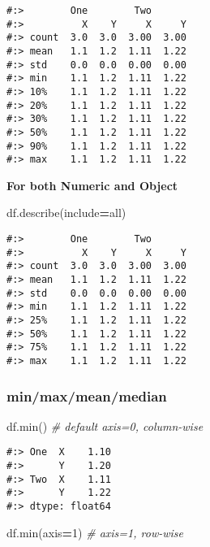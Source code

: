 \documentclass[
]{book}
\newenvironment{Shaded}{\begin{snugshade}}{\end{snugshade}}
\newcommand{\BuiltInTok}[1]{#1}
\newcommand{\CommentTok}[1]{\textcolor[rgb]{0.37,0.37,0.37}{\textit{#1}}}
\newcommand{\DecValTok}[1]{\textcolor[rgb]{0.06,0.06,0.06}{#1}}
\newcommand{\NormalTok}[1]{#1}
\newcommand{\OperatorTok}[1]{\textcolor[rgb]{0.43,0.43,0.43}{\textbf{#1}}}
\newcommand{\StringTok}[1]{\textcolor[rgb]{0.5,0.5,0.5}{#1}}
\begin{document}
\begin{verbatim}
#:>        One        Two      
#:>          X    Y     X     Y
#:> count  3.0  3.0  3.00  3.00
#:> mean   1.1  1.2  1.11  1.22
#:> std    0.0  0.0  0.00  0.00
#:> min    1.1  1.2  1.11  1.22
#:> 10%    1.1  1.2  1.11  1.22
#:> 20%    1.1  1.2  1.11  1.22
#:> 30%    1.1  1.2  1.11  1.22
#:> 50%    1.1  1.2  1.11  1.22
#:> 90%    1.1  1.2  1.11  1.22
#:> max    1.1  1.2  1.11  1.22
\end{verbatim}

\textbf{For both Numeric and Object}

\begin{Shaded}
\begin{Highlighting}[]
\NormalTok{df.describe(include}\OperatorTok{=}\StringTok{\textquotesingle{}all\textquotesingle{}}\NormalTok{)}
\end{Highlighting}
\end{Shaded}

\begin{verbatim}
#:>        One        Two      
#:>          X    Y     X     Y
#:> count  3.0  3.0  3.00  3.00
#:> mean   1.1  1.2  1.11  1.22
#:> std    0.0  0.0  0.00  0.00
#:> min    1.1  1.2  1.11  1.22
#:> 25%    1.1  1.2  1.11  1.22
#:> 50%    1.1  1.2  1.11  1.22
#:> 75%    1.1  1.2  1.11  1.22
#:> max    1.1  1.2  1.11  1.22
\end{verbatim}

\hypertarget{minmaxmeanmedian}{%
\subsubsection{min/max/mean/median}\label{minmaxmeanmedian}}

\begin{Shaded}
\begin{Highlighting}[]
\NormalTok{df.}\BuiltInTok{min}\NormalTok{()  }\CommentTok{\# default axis=0, column{-}wise}
\end{Highlighting}
\end{Shaded}

\begin{verbatim}
#:> One  X    1.10
#:>      Y    1.20
#:> Two  X    1.11
#:>      Y    1.22
#:> dtype: float64
\end{verbatim}

\begin{Shaded}
\begin{Highlighting}[]
\NormalTok{df.}\BuiltInTok{min}\NormalTok{(axis}\OperatorTok{=}\DecValTok{1}\NormalTok{) }\CommentTok{\# axis=1, row{-}wise}
\end{Highlighting}
\end{Shaded}
\end{document}
